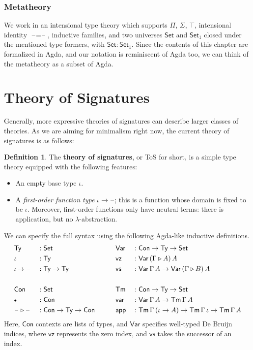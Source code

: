 \documentclass[12pt,a4paper,twoside,openany]{book}
\theoremstyle{remark}
\theoremstyle{definition}
\newtheorem{mydefinition}{Definition}
\theoremstyle{theorem}
\newcommand{\ms}[1]{\mathsf{#1}}
\newcommand{\Con}{\mathsf{Con}}
\newcommand{\Tm}{\mathsf{Tm}}
\newcommand{\Ty}{\mathsf{Ty}}
\newcommand{\blank}{\mathord{\hspace{1pt}\text{--}\hspace{1pt}}}
\newcommand{\Set}{\mathsf{Set}}
\newcommand{\ext}{\triangleright}
\newcommand{\emptycon}{\scaleobj{.75}\bullet}
\newcommand{\Var}{\ms{Var}}
\newcommand{\var}{\ms{var}}
\newcommand{\app}{\ms{app}}
\newcommand{\vz}{\ms{vz}}
\newcommand{\vs}{\ms{vs}}
\begin{document}
\subsubsection{Metatheory}

We work in an intensional type theory which supports $\Pi$, $\Sigma$, $\top$,
intensional identity $\blank\!=\!\blank$, inductive families, and two universes
$\Set$ and $\Set_1$ closed under the mentioned type formers, with $\Set :
\Set_1$.  Since the contents of this chapter are formalized in Agda, and our
notation is reminiscent of Agda too, we can think of the metatheory as a
subset of Agda.

\section{Theory of Signatures}
\label{sec:simple-signatures}

Generally, more expressive theories of signatures can describe larger classes of
theories. As we are aiming for minimalism right now, the current theory of
signatures is as follows:

\begin{mydefinition}
The \textbf{theory of signatures}, or ToS for short, is a simple type theory
equipped with the following features:
  \begin{itemize}
    \item An empty base type $\iota$.
    \item A \emph{first-order function type} $\iota\!\to\!\blank$; this is a
      function whose domain is fixed to be $\iota$. Moreover, first-order functions only
      have neutral terms: there is application, but no $\lambda$-abstraction.
  \end{itemize}
\end{mydefinition}

We can specify the full syntax using the following Agda-like inductive definitions.
\begin{alignat*}{4}
  & \Ty              &&: \Set           && \Var &&: \Con \to \Ty \to \Set \\
  & \iota            &&: \Ty            && \vz  &&: \Var\,(\Gamma \ext A)\,A \\
  & \iota\!\to\blank &&: \Ty \to \Ty    && \vs  &&: \Var\,\Gamma\,A \to \Var\,(\Gamma \ext B)\,A\\
  & && && &&\\
  & \Con             &&: \Set           && \Tm  &&: \Con \to \Ty \to \Set \\
  & \emptycon        &&: \Con           && \var &&: \Var\,\Gamma\,A \to \Tm\,\Gamma\,A \\
  & \blank\ext\blank &&: \Con \to \Ty \to \Con \hspace{2em} && \app &&: \Tm\,\Gamma\,(\iota\to A) \to \Tm\,\Gamma\,\iota
                                                           \to \Tm\,\Gamma\,A
\end{alignat*}
Here, $\Con$ contexts are lists of types, and $\Var$ specifies well-typed De Bruijn indices, where
$\vz$ represents the zero index, and $\vs$ takes the successor of an index.
\end{document}
